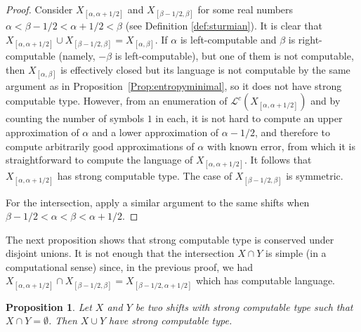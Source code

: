 \documentclass[french,american]{article}
\theoremstyle{plain}
\newtheorem{proposition}[theorem]{Proposition}
\theoremstyle{definition}
\theoremstyle{remark}
\theoremstyle{plain}
\renewcommand{\L}{\mathcal L}
\begin{document}
\begin{proof}
Consider $X_{[\alpha,\alpha+1/2]}$ and $X_{[\beta-1/2,\beta]}$ for
some real numbers $\alpha<\beta-1/2<\alpha+1/2<\beta$ (see Definition
\ref{def:sturmian}). It is clear that $X_{[\alpha,\alpha+1/2]}\cup X_{[\beta-1/2,\beta]}=X_{[\alpha,\beta]}$.
If $\alpha$ is left-computable and $\beta$ is right-computable (namely,
$-\beta$ is left-computable), but one of them is not computable,
then $X_{[\alpha,\beta]}$ is effectively closed but its language is not computable
by the same argument as in Proposition~\ref{Prop:entropyminimal},
so it does not have strong computable type. However, from an enumeration
of $\L^{c}(X_{[\alpha,\alpha+1/2]})$ and by counting the number of
symbols $1$ in each, it is not hard to compute an upper approximation
of $\alpha$ and a lower approximation of $\alpha-1/2$, and therefore
to compute arbitrarily good approximations of $\alpha$ with known
error, from which it is straightforward to compute the language of
$X_{[\alpha,\alpha+1/2]}$. It follows that $X_{[\alpha,\alpha+1/2]}$
has strong computable type. The case of $X_{[\beta-1/2,\beta]}$ is
symmetric. 

For the intersection, apply a similar argument to the same shifts when $\beta-1/2<\alpha<\beta<\alpha+1/2$.
\end{proof}

The next proposition shows that strong computable type is conserved under disjoint unions. It is not enough that the intersection $X \cap Y$ is simple (in a computational sense) since, in the previous proof, we had $X_{[\alpha,\alpha+1/2]}\cap X_{[\beta-1/2,\beta]} = X_{[\beta-1/2,\alpha+1/2]}$ which has computable language.

\begin{proposition}
Let $X$ and $Y$ be two shifts with strong computable type such that $X\cap Y = \emptyset$. Then $X\cup Y$ have strong computable type.
\end{proposition}
\end{document}
